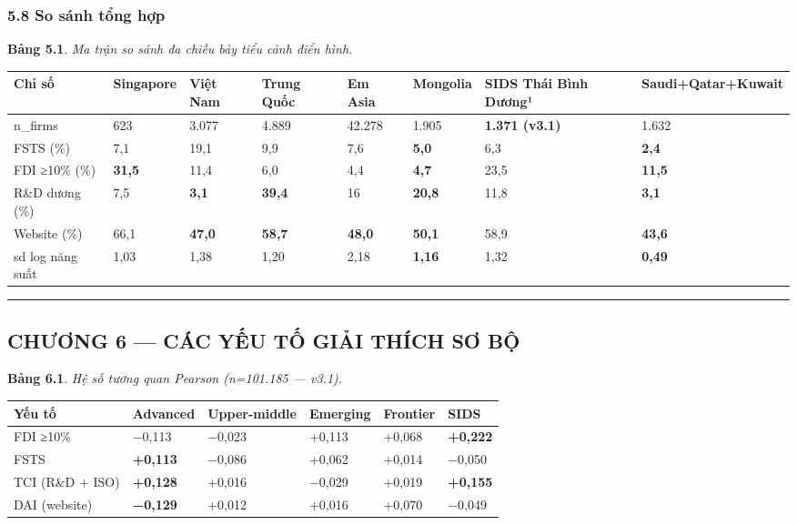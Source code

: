 \documentclass[12pt,a4paper]{article}
\begin{document}
\hypertarget{58-so-suxe1nh-tux1ed5ng-hux1ee3p}{%
\subsubsection{5.8 So sánh tổng
hợp}\label{58-so-suxe1nh-tux1ed5ng-hux1ee3p}}

\textbf{Bảng 5.1}. \emph{Ma trận so sánh đa chiều bảy tiểu cảnh điển
hình.}

\begin{longtable}[]{@{}llllllll@{}}
\toprule\noalign{}
Chỉ số & Singapore & Việt Nam & Trung Quốc & Em Asia & Mongolia & SIDS
Thái Bình Dương¹ & Saudi+Qatar+Kuwait \\
\midrule\noalign{}
\endhead
\bottomrule\noalign{}
\endlastfoot
n\_firms & 623 & 3.077 & 4.889 & 42.278 & 1.905 & \textbf{1.371 (v3.1)}
& 1.632 \\
FSTS (\%) & 7,1 & 19,1 & 9,9 & 7,6 & \textbf{5,0} & 6,3 &
\textbf{2,4} \\
FDI ≥10\% (\%) & \textbf{31,5} & 11,4 & 6,0 & 4,4 & \textbf{4,7} & 23,5
& \textbf{11,5} \\
R\&D dương (\%) & 7,5 & \textbf{3,1} & \textbf{39,4} & 16 &
\textbf{20,8} & 11,8 & \textbf{3,1} \\
Website (\%) & 66,1 & \textbf{47,0} & \textbf{58,7} & \textbf{48,0} &
\textbf{50,1} & 58,9 & \textbf{43,6} \\
sd log năng suất & 1,03 & 1,38 & 1,20 & 2,18 & \textbf{1,16} & 1,32 &
\textbf{0,49} \\
\end{longtable}

\begin{center}\rule{0.5\linewidth}{0.5pt}\end{center}

\hypertarget{chux1b0ux1a1ng-6--cuxe1c-yux1ebfu-tux1ed1-giux1ea3i-thuxedch-sux1a1-bux1ed9}{%
\subsection{CHƯƠNG 6 --- CÁC YẾU TỐ GIẢI THÍCH SƠ
BỘ}\label{chux1b0ux1a1ng-6--cuxe1c-yux1ebfu-tux1ed1-giux1ea3i-thuxedch-sux1a1-bux1ed9}}

\textbf{Bảng 6.1}. \emph{Hệ số tương quan Pearson (n=101.185 --- v3.1).}

\begin{longtable}[]{@{}llllll@{}}
\toprule\noalign{}
Yếu tố & Advanced & Upper-middle & Emerging & Frontier & SIDS \\
\midrule\noalign{}
\endhead
\bottomrule\noalign{}
\endlastfoot
FDI ≥10\% & −0,113 & −0,023 & +0,113 & +0,068 & \textbf{+0,222} \\
FSTS & \textbf{+0,113} & −0,086 & +0,062 & +0,014 & −0,050 \\
TCI (R\&D + ISO) & \textbf{+0,128} & +0,016 & −0,029 & +0,019 &
\textbf{+0,155} \\
DAI (website) & \textbf{−0,129} & +0,012 & +0,016 & +0,070 & −0,049 \\
\end{longtable}
\end{document}
